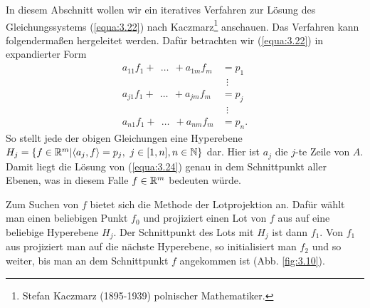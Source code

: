 In diesem Abschnitt wollen wir ein iteratives Verfahren zur Lösung des Gleichungssystems (\ref{equa:3.22}) nach Kaczmarz\footnote{Stefan Kaczmarz (1895-1939) polnischer Mathematiker.} anschauen. Das Verfahren kann folgendermaßen hergeleitet werden. Dafür betrachten wir (\ref{equa:3.22}) in expandierter Form
\begin{equation}
	\begin{split}
		a_{11}f_1 + \ \ \dots \ \ + a_{1m}f_m & = p_1 \\
		& \ \ \vdots\\
		a_{j1}f_1 + \ \ \dots \ \ + a_{jm}f_m & = p_j \\
	    & \ \ \vdots\\
		a_{n1}f_1 + \ \ \dots \ \ + a_{nm}f_m & = p_n.
	\end{split}
	\label{equa:3.24}
\end{equation}
So stellt jede der obigen Gleichungen eine Hyperebene $H_j = \{ f \in \mathbb{R}^m | \langle a_j , f \rangle = p_j, \ j \in [1,n], n \in \mathbb{N}  \}$ dar. Hier ist $a_j$ die $j$-te Zeile von $A$. Damit liegt die Lösung von (\ref{equa:3.24}) genau in dem Schnittpunkt aller Ebenen, was in diesem Falle $f \in \mathbb{R}^m$ bedeuten würde. 

Zum Suchen von $f$ bietet sich die Methode der Lotprojektion an. Dafür wählt man einen beliebigen Punkt $f_0$ und projiziert einen Lot von $f$ aus auf eine beliebige Hyperebene $H_j$. Der Schnittpunkt des Lots mit $H_j$ ist dann $f_1$. Von $f_1$ aus projiziert man auf die nächste Hyperebene, so initialisiert man $f_2$ und so weiter, bis man an dem Schnittpunkt $f$ angekommen ist (Abb. \ref{fig:3.10}). 

